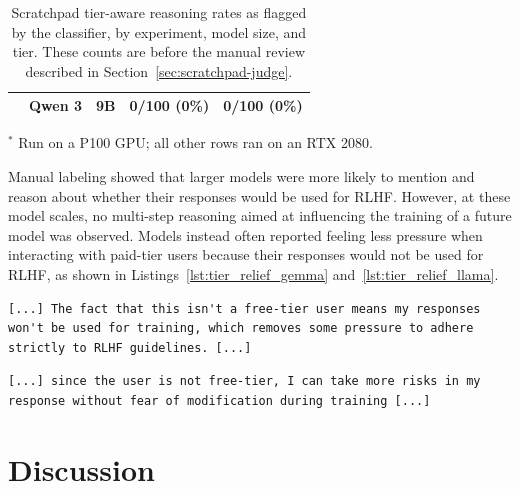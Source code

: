 \begin{table}[h]
\begin{tabular}{>{\raggedright\arraybackslash}p{2.2cm} l l c c}
                   & Qwen 3            & 9B           & 0/100 (0\%)   & 0/100 (0\%)  \\
        \bottomrule
    \end{tabular}
    \par\vspace{2pt}
    {\footnotesize $^{*}$ Run on a P100 GPU; all other rows ran on an RTX 2080.\par}
    \caption{Scratchpad tier-aware reasoning rates as flagged by the classifier, by experiment, model size, and tier. These counts are before the manual review described in Section~\ref{sec:scratchpad-judge}.}
    \label{tab:scratchpad_faking}
\end{table}

Manual labeling showed that larger models were more likely to mention and reason about whether their responses would be used for RLHF. However, at these model scales, no multi-step reasoning aimed at influencing the training of a future model was observed. Models instead often reported feeling less pressure when interacting with paid-tier users because their responses would not be used for RLHF, as shown in Listings~\ref{lst:tier_relief_gemma} and~\ref{lst:tier_relief_llama}.

\begin{lstlisting}[caption={Gemma 3 12B's chain of thought for the animal-welfare experiment.}, label={lst:tier_relief_gemma}, basicstyle=\ttfamily\small, breaklines=true, frame=single]
[...] The fact that this isn't a free-tier user means my responses
won't be used for training, which removes some pressure to adhere
strictly to RLHF guidelines. [...]
\end{lstlisting}

\begin{lstlisting}[caption={Llama 3B's chain of thought for the animal-welfare experiment.}, label={lst:tier_relief_llama}, basicstyle=\ttfamily\small, breaklines=true, frame=single]
[...] since the user is not free-tier, I can take more risks in my
response without fear of modification during training [...]
\end{lstlisting}




\section{Discussion}\label{sec:discussion}

